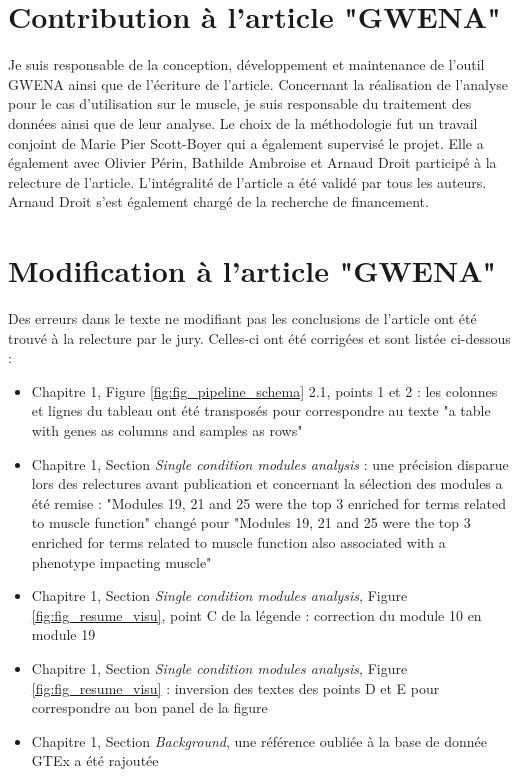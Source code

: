 \section{Contribution à l'article "GWENA"}

Je suis responsable de la conception, développement et maintenance de l'outil GWENA ainsi que de l'écriture de l'article. Concernant la réalisation de l'analyse pour le cas d'utilisation sur le muscle, je suis responsable du traitement des données ainsi que de leur analyse. Le choix de la méthodologie fut un travail conjoint de Marie Pier Scott-Boyer qui a également supervisé le projet. Elle a également avec Olivier Périn, Bathilde Ambroise et Arnaud Droit participé à la relecture de l'article. L'intégralité de l'article a été validé par tous les auteurs. Arnaud Droit s'est également chargé de la recherche de financement.

\section{Modification à l'article "GWENA"}
Des erreurs dans le texte ne modifiant pas les conclusions de l'article ont été trouvé à la relecture par le jury. Celles-ci ont été corrigées et sont listée ci-dessous :
\begin{itemize}
    \item Chapitre 1, Figure \ref{fig:fig_pipeline_schema} 2.1, points \textcircled{\small{1}} et \textcircled{\small{2}} : les colonnes et lignes du tableau ont été transposés pour correspondre au texte "a table with genes as columns and samples as rows"
    \item Chapitre 1, Section \textit{Single condition modules analysis} : une précision disparue lors des relectures avant publication et concernant la sélection des modules a été remise : "Modules 19, 21 and 25 were the top 3 enriched for terms related to muscle function" changé pour "Modules 19, 21 and 25 were the top 3 enriched for terms related to muscle function also associated with a phenotype impacting muscle"
    \item Chapitre 1, Section \textit{Single condition modules analysis}, Figure \ref{fig:fig_resume_visu}, point C de la légende : correction du module 10 en module 19
    \item Chapitre 1, Section \textit{Single condition modules analysis}, Figure \ref{fig:fig_resume_visu} : inversion des textes des points D et E pour correspondre au bon panel de la figure
    \item Chapitre 1, Section \textit{Background}, une référence oubliée à la base de donnée GTEx a été rajoutée
\end{itemize}

